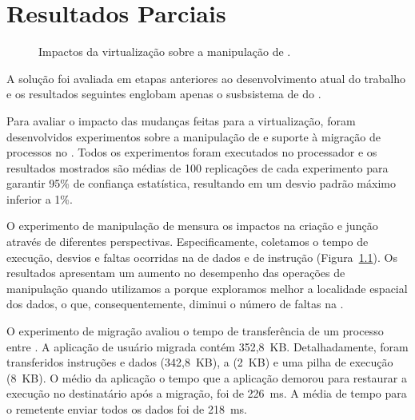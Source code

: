 \glsresetall
\chapter{Resultados Parciais}
\label{chap.results}

\begin{figure}[tb]
    \centering%
    \quad%
    \caption{Impactos da virtualização sobre a manipulação de \threads.\label{fig.threads}}%
\end{figure}

A solução foi avaliada em etapas anteriores ao desenvolvimento atual do trabalho e os resultados seguintes englobam apenas o susbsistema de \threads do \nanvix. 

Para avaliar o impacto das mudanças feitas para a virtualização, foram desenvolvidos experimentos sobre a manipulação de \threads e suporte à migração de processos no \nanvix. Todos os experimentos foram executados no processador \mppa e os resultados mostrados são médias de 100 replicações de cada experimento para garantir 95\% de confiança estatística, resultando em um desvio padrão máximo inferior a 1\%.

O experimento de manipulação de \threads mensura os impactos na criação e junção através de diferentes perspectivas. Especificamente, coletamos o tempo de execução, desvios e faltas ocorridas na \cache de dados e de instrução (Figura~\ref{fig.threads}).
Os resultados apresentam um aumento no desempenho das operações de manipulação quando utilizamos a \uarea porque exploramos melhor a localidade espacial dos dados, o que, consequentemente, diminui o número de faltas na \cache.

O experimento de migração avaliou o tempo de transferência de um processo entre \clusters.
A aplicação de usuário migrada contém 352,8~KB. Detalhadamente, foram transferidos instruções e dados (342,8~KB), a \uarea (2~KB) e uma pilha de execução (8~KB). O \downtime médio da aplicação \ie o tempo que a aplicação demorou para restaurar a execução no \cluster destinatário após a migração, foi de 226~ms. A média de tempo para o \cluster remetente enviar todos os dados foi de 218~ms.